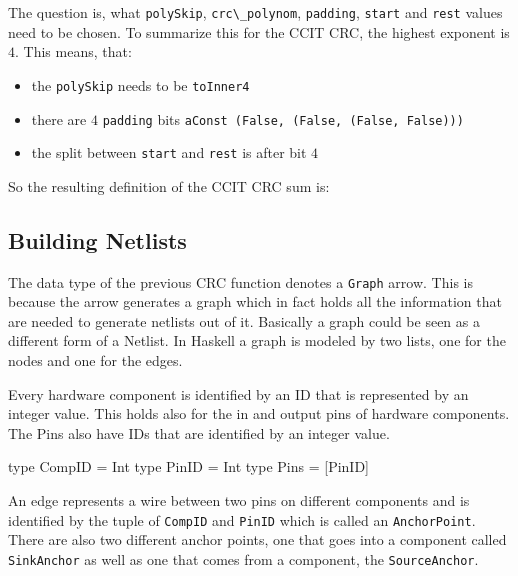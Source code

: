 \documentclass[9pt,final,a4paper,leqno]{article}
\newcommand{\hs}[1]{\mbox{\lstinline[basicstyle=\color{textgray}]!#1!}}
\begin{document}
\par
The question is, what \hs{polySkip}, \hs{crc\_polynom}, \hs{padding}, \hs{start} and \hs{rest} values need to be chosen. To summarize this
for the CCIT CRC, the highest exponent is $4$. This means, that:
\begin{itemize}
  \item the \hs{polySkip} needs to be \hs{toInner4}
  \item there are $4$ \hs{padding} bits \hs{aConst (False, (False, (False, False)))} 
  \item the split between \hs{start} and \hs{rest} is after bit $4$
\end{itemize}

So the resulting definition of the CCIT CRC sum is:

\subsection{Building Netlists}
The data type of the previous CRC function denotes a \hs{Graph} arrow. This is because the arrow generates a graph which in fact holds all
the information that are needed to generate netlists out of it. Basically a graph could be seen as a different form of a Netlist. In Haskell
a graph is modeled by two lists, one for the nodes and one for the edges.

\par
Every hardware component is identified by an ID that is represented by an integer value. This holds also for the in and output pins of
hardware components. The Pins also have IDs that are identified by an integer value.
\begin{haskell}
type CompID = Int
type PinID  = Int
type Pins   = [PinID]
\end{haskell}

\par
An edge represents a wire between two pins on different components and is identified by the tuple of \hs{CompID} and \hs{PinID} which is
called an \hs{AnchorPoint}. There are also two different anchor points, one that goes into a component called \hs{SinkAnchor} as well as one
that comes from a component, the \hs{SourceAnchor}. 
\end{document}
